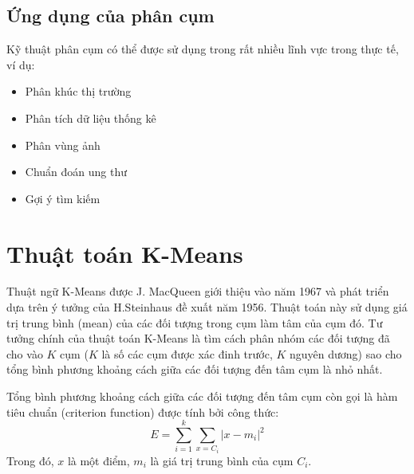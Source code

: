 \documentclass{article}
\begin{document}
    \subsection{Ứng dụng của phân cụm}
    Kỹ thuật phân cụm có thể được sử dụng trong rất nhiều lĩnh vực trong thực tế, ví dụ:
    \begin{itemize}
        \item Phân khúc thị trường
        \item Phân tích dữ liệu thống kê
        \item Phân vùng ảnh
        \item Chuẩn đoán ung thư
        \item Gợi ý tìm kiếm
    \end{itemize}

    \newpage

    \section{Thuật toán K-Means}
    \label{sec:kmeans}
    Thuật ngữ K-Means được J. MacQueen giới thiệu vào năm 1967 và phát triển dựa trên ý tưởng của H.Steinhaus đề xuất năm 1956. Thuật toán này sử dụng giá trị trung bình (mean) của các đối tượng trong cụm làm tâm của cụm đó. Tư tưởng chính của thuật toán K-Means là tìm cách phân nhóm các đối tượng đã cho vào $K$ cụm ($K$ là số các cụm được xác đinh trước, $K$ nguyên dương) sao cho tổng bình phương khoảng cách giữa các đối tượng đến tâm cụm là nhỏ nhất.

    Tổng bình phương khoảng cách giữa các đối tượng đến tâm cụm còn gọi là hàm tiêu chuẩn (criterion function) được tính bởi công thức:
    $$E = \sum\limits_{i=1}^k \sum\limits_{x=C_i} |x - m_i|^2$$
    Trong đó, $x$ là một điểm, $m_i$ là giá trị trung bình của cụm $C_i$.\\
\end{document}
